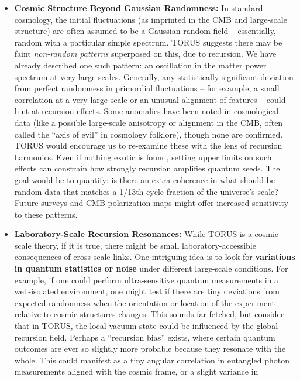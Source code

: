 \documentclass[
]{article}
\begin{document}
\begin{itemize}
\item
  \textbf{Cosmic Structure Beyond Gaussian Randomness:} In standard
  cosmology, the initial fluctuations (as imprinted in the CMB and
  large-scale structure) are often assumed to be a Gaussian random field
  -- essentially, random with a particular simple spectrum. TORUS
  suggests there may be faint \emph{non-random patterns} superposed on
  this, due to recursion. We have already described one such pattern: an
  oscillation in the matter power spectrum at very large
  scales\hspace{0pt}. Generally, any statistically significant deviation
  from perfect randomness in primordial fluctuations -- for example, a
  small correlation at a very large scale or an unusual alignment of
  features -- could hint at recursion effects. Some anomalies have been
  noted in cosmological data (like a possible large-scale anisotropy or
  alignment in the CMB, often called the ``axis of evil'' in cosmology
  folklore), though none are confirmed. TORUS would encourage us to
  re-examine these with the lens of recursion harmonics. Even if nothing
  exotic is found, setting upper limits on such effects can constrain
  how strongly recursion amplifies quantum seeds. The goal would be to
  quantify: is there an extra coherence in what should be random data
  that matches a 1/13th cycle fraction of the universe's scale? Future
  surveys and CMB polarization maps might offer increased sensitivity to
  these patterns.
\item
  \textbf{Laboratory-Scale Recursion Resonances:} While TORUS is a
  cosmic-scale theory, if it is true, there might be small
  laboratory-accessible consequences of cross-scale links. One
  intriguing idea is to look for \textbf{variations in quantum
  statistics or noise} under different large-scale conditions. For
  example, if one could perform ultra-sensitive quantum measurements in
  a well-isolated environment, one might test if there are tiny
  deviations from expected randomness when the orientation or location
  of the experiment relative to cosmic structures changes. This sounds
  far-fetched, but consider that in TORUS, the local vacuum state could
  be influenced by the global recursion field. Perhaps a ``recursion
  bias'' exists, where certain quantum outcomes are ever so slightly
  more probable because they resonate with the whole. This could
  manifest as a tiny angular correlation in entangled photon
  measurements aligned with the cosmic frame, or a slight variance in

\end{itemize}
\end{document}
